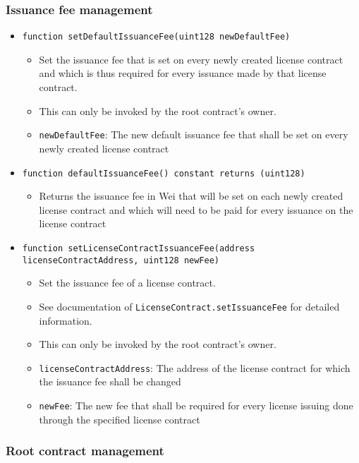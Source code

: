 \documentclass[a4paper]{article}
\begin{document}
\subsubsection{Issuance fee management}

\begin{itemize}
  \item \texttt{function setDefaultIssuanceFee(uint128 newDefaultFee)}
  \begin{itemize}
    \item Set the issuance fee that is set on every newly created license contract and which is thus required for every issuance made by that license contract.
    \item This can only be invoked by the root contract's owner.
    \item \texttt{newDefaultFee}: The new default issuance fee that shall be set on every newly created license contract
  \end{itemize}
  
  \item \texttt{function defaultIssuanceFee() constant returns (uint128)}
  \begin{itemize}
    \item Returns the issuance fee in Wei that will be set on each newly created license contract and which will need to be paid for every issuance on the license contract
  \end{itemize}
  
  \item \texttt{function setLicenseContractIssuanceFee(address licenseContractAddress, uint128 newFee)}
  \begin{itemize}
    \item Set the issuance fee of a license contract. 
    \item See documentation of \texttt{LicenseContract.setIssuanceFee} for detailed information.
    \item This can only be invoked by the root contract's owner.
    \item \texttt{licenseContractAddress}: The address of the license contract for which the issuance fee shall be changed
    \item \texttt{newFee}: The new fee that shall be required for every license issuing done through the specified license contract
  \end{itemize}
\end{itemize}

\subsubsection{Root contract management}
  
\end{document}
